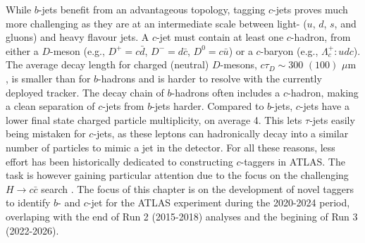 While $b$-jets benefit from an advantageous topology, tagging $c$-jets proves much more challenging as they are at an intermediate scale between light- ($u$, $d$, $s$, and gluons) and heavy flavour jets. A $c$-jet must contain at least one $c$-hadron, from either a $D$-meson (e.g., $D^+=c\bar{d}$, $D^-=d\bar{c}$, $D^0=c\bar{u}$) or a $c$-baryon (e.g., $\Lambda_c^+:udc$). The average decay length for charged (neutral) $D$-mesons, $c\tau_D \sim 300$ $(100)$ $\mu$m \cite{Tanabashi:2018oca}, is smaller than for $b$-hadrons and is harder to resolve with the currently deployed tracker. The decay chain of $b$-hadrons often includes a $c$-hadron, making a clean separation of $c$-jets from $b$-jets harder. Compared to $b$-jets, $c$-jets have a lower final state charged particle multiplicity, on average 4. This lets $\tau$-jets easily being mistaken for $c$-jets, as these leptons can hadronically decay into a similar number of particles to mimic a jet in the detector. For all these reasons, less effort has been historically dedicated to constructing $c$-taggers in ATLAS. The task is however gaining particular attention due to the focus on the challenging $H \rightarrow c\bar{c}$ search \cite{Aaboud:2018fhh, Collaboration:2721696, arXiv:2205.05550}. The focus of this chapter is on the development of novel taggers to identify $b$- and $c$-jet for the ATLAS experiment during the 2020-2024 period, overlaping with the end of Run 2 (2015-2018) analyses and the begining of Run 3 (2022-2026).

